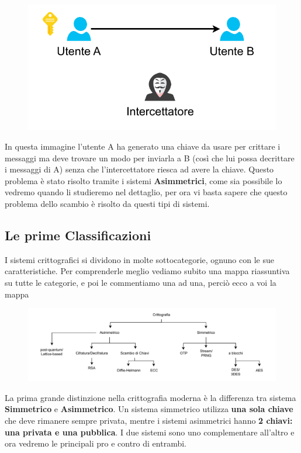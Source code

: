 \documentclass{report}
\begin{document}
\begin{figure}[h]
    \centering
    \includegraphics[width=0.6\linewidth]{logos/critpo5pdf.pdf}
\end{figure}

In questa immagine l'utente A ha generato una chiave da usare per crittare i messaggi ma deve trovare un modo per inviarla a B (così che lui possa decrittare i messaggi di A) senza che l'intercettatore riesca ad avere la chiave. Questo problema è stato risolto tramite i sistemi \textbf{Asimmetrici}, come sia possibile lo vedremo quando li studieremo nel dettaglio, per ora vi basta sapere che questo problema dello scambio è risolto da questi tipi di sistemi.




\subsection{Le prime Classificazioni}

I sistemi crittografici si dividono in molte sottocategorie, ognuno con le sue caratteristiche. Per comprenderle meglio vediamo subito una mappa riassuntiva su tutte le categorie, e poi le commentiamo una ad una, perciò ecco a voi la mappa

\begin{figure}[h]
    \centering
    \includegraphics[width=\linewidth]{logos/cripto4.pdf}
\end{figure}





La prima grande distinzione nella crittografia moderna è la differenza tra sistema \textbf{Simmetrico} e \textbf{Asimmetrico}. Un sistema simmetrico utilizza \textbf{una sola chiave} che deve rimanere sempre privata, mentre i sistemi asimmetrici hanno \textbf{2 chiavi: una privata e una pubblica}. I due sistemi sono uno complementare all'altro e ora vedremo le principali pro e contro di entrambi.
\end{document}
